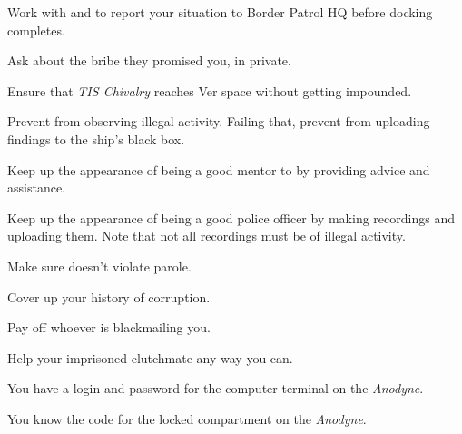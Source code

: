 \documentclass[char]{guildcamp4}
\begin{document}
\begin{itemz}[Goals]
	\item Work with \cCgood{} and \cPilot{} to report your situation to Border Patrol HQ before docking completes.
	\item Ask \cVone{} about the bribe they promised you, in private.
	\item Ensure that \emph{TIS Chivalry} reaches Ver space without getting impounded.
	\item Prevent \cCgood{} from observing illegal activity. Failing that, prevent \cCgood{\them} from uploading \cCgood{\their} findings to the ship's black box.
	\item Keep up the appearance of being a good mentor to \cCgood{} by providing advice and assistance.
	\item Keep up the appearance of being a good police officer by making recordings and uploading them. Note that not all recordings must be of illegal activity.
	\item Make sure \cPilot{} doesn't violate  parole. 
	\item Cover up your history of corruption.
	\item Pay off whoever is blackmailing you.
	\item Help your imprisoned clutchmate any way you can.
\end{itemz}

\begin{itemz}[Notes]
	\item You have a login and password for the computer terminal on the \emph{Anodyne}.
	\item You know the code for the locked compartment on the \emph{Anodyne}.
\end{itemz}

\begin{contacts}
	\contact{\cCgood{}}
	\contact{\cPilot{}}
	\contact{\cVone{}}
\end{contacts}
\end{document}
